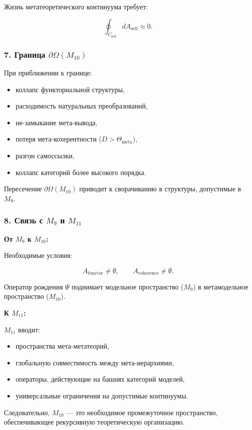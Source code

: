 Жизнь метатеоретического континуума требует:

\[
\oint_{C_{\mathrm{self}}} dA_{\mathrm{self}} \approx 0.
\]

\subsubsection*{7. Граница \texorpdfstring{$\partial\Omega(M_{10})$}{\partial\Omega(M_{10})}}

При приближении к границе:

\begin{itemize}
    \item коллапс функториальной структуры,
    \item расходимость натуральных преобразований,
    \item не-замыкание мета-вывода,
    \item потеря мета-кохерентности ($D>\Theta_{\mathrm{meta}}$),
    \item разгон самоссылки,
    \item коллапс категорий более высокого порядка.
\end{itemize}

Пересечение $\partial\Omega(M_{10})$ приводит к сворачиванию в структуры, допустимые в $M_9$.

\subsubsection*{8. Связь с \texorpdfstring{$M_9$}{M_9} и $M_{11}$}

\textbf{От $M_9$ к $M_{10}$:}

Необходимые условия:

\[
A_{\mathrm{functor}}\neq\emptyset,\qquad
A_{\mathrm{coherence}}\neq\emptyset.
\]

Оператор рождения $\Psi$ поднимает модельное пространство ($M_9$) в метамодельное пространство ($M_{10}$).

\textbf{К $M_{11}$:}

$M_{11}$ вводит:

\begin{itemize}
    \item пространства мета-метатеорий,
    \item глобальную совместимость между мета-иерархиями,
    \item операторы, действующие на башнях категорий моделей,
    \item универсальные ограничения на допустимые континуумы.
\end{itemize}

Следовательно, $M_{10}$ — это необходимое промежуточное пространство,
обеспечивающее рекурсивную теоретическую организацию.
